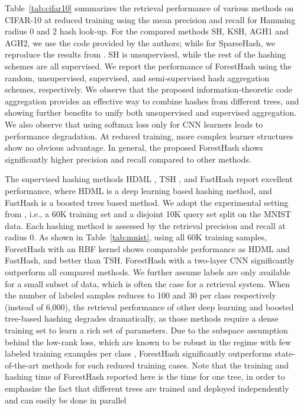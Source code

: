 \documentclass[runningheads]{llncs}
\begin{document}
Table~\ref{tab:cifar10} summarizes the retrieval performance of various methods
on CIFAR-10 at reduced training using the mean precision and recall for Hamming
radius 0 and 2 hash look-up.  For the compared methods SH, KSH, AGH1 and AGH2, we
use the code provided by the authors; while for SparseHash, we reproduce the
results from \cite{sparsehash}. SH is unsupervised, while the rest of the
hashing schemes are all supervised.  We report the performance of ForestHash
using the random, unsupervised, supervised, and semi-supervised hash aggregation
schemes, respectively.  We observe that the proposed information-theoretic code
aggregation provides an effective way to combine hashes from different trees,
and showing further benefits to unify both unsupervised and supervised
aggregation.  We also observe that using softmax loss only for CNN learners
leads to performance degradation.
 At reduced training, more complex learner
structures show no obvious advantage.  In general, the proposed ForestHash shows
significantly higher precision and recall compared to other methods.


The supervised hashing methods HDML \cite{HDML}, TSH \cite{tsh}, and FastHash
\cite{fasthash} report excellent performance, where HDML is a deep learning
based hashing method, and FastHash is a boosted trees based method.  We adopt
the experimental setting from \cite{HDML}, i.e., a 60K training set and a
disjoint 10K query set split on the MNIST data.  Each hashing method is assessed
by the retrieval precision and recall at radius 0.  As shown in
Table~\ref{tab:mnist}, using all 60K training samples, ForestHash with an RBF
kernel shows comparable performance as HDML and FastHash, and better than
TSH. ForestHash with a two-layer CNN significantly outperform all compared
methods.  We further assume labels are only available for a small subset of
data, which is often the case for a retrieval system. When the number of labeled
samples reduces to 100 and 30 per class respectively (instead of 6,000), the
retrieval performance of other deep learning and boosted tree-based hashing
degrades dramatically, as those methods require a dense training set to learn a
rich set of parameters.  Due to the subspace assumption behind the low-rank
loss, which are known to be robust in the regime with few labeled training
examples per class \cite{revlearn}, ForestHash significantly outperforms
state-of-the-art methods for such reduced training cases.  Note that the
training and hashing time of ForestHash reported here is the time for one tree,
in order to emphasize the fact that different trees are trained and deployed
independently and can easily be done in parallel
\end{document}
